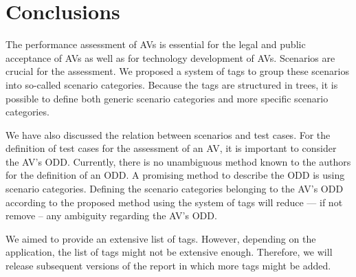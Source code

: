 \section{Conclusions}
\label{sec:conclusions}

The performance assessment of AVs is essential for the legal and public acceptance of AVs as well as for technology development of AVs. 
Scenarios are crucial for the assessment. We proposed a system of tags to group these scenarios into so-called scenario categories. Because the tags are structured in trees, it is possible to define both generic scenario categories and more specific scenario categories.

We have also discussed the relation between scenarios and test cases. For the definition of test cases for the assessment of an AV, it is important to consider the AV's ODD. Currently, there is no unambiguous method known to the authors for the definition of an ODD. A promising method to describe the ODD is using scenario categories. Defining the scenario categories belonging to the AV's ODD according to the proposed method using the system of tags will reduce --- if not remove -- any ambiguity regarding the AV's ODD.

We aimed to provide an extensive list of tags. However, depending on the application, the list of tags might not be extensive enough. Therefore, we will release subsequent versions of the report \autocite{degelder2019scenariocategories} in which more tags might be added. 

